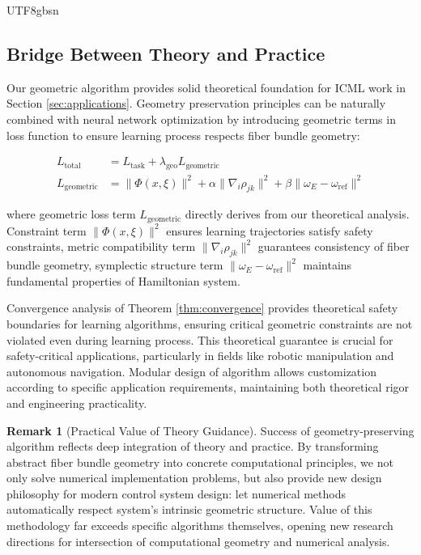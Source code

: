 \documentclass[a4paper,12pt]{extarticle}
\theoremstyle{definition}
\newtheorem{remark}{Remark}
\begin{document}
\begin{CJK}{UTF8}{gbsn}
\subsection{Bridge Between Theory and Practice}
\label{subsec:theory_practice_bridge}

Our geometric algorithm provides solid theoretical foundation for ICML work \cite{zheng2025learning} in Section \ref{sec:applications}. Geometry preservation principles can be naturally combined with neural network optimization by introducing geometric terms in loss function to ensure learning process respects fiber bundle geometry:

\begin{align}
L_{\text{total}} &= L_{\text{task}} + \lambda_{\text{geo}} L_{\text{geometric}} \label{eq:ml_loss}\\
L_{\text{geometric}} &= \|\Phi(x, \xi)\|^2 + \alpha\|\nabla_i\rho_{jk}\|^2 + \beta\|\omega_E - \omega_{\text{ref}}\|^2 \label{eq:geo_loss}
\end{align}

where geometric loss term $L_{\text{geometric}}$ directly derives from our theoretical analysis. Constraint term $\|\Phi(x, \xi)\|^2$ ensures learning trajectories satisfy safety constraints, metric compatibility term $\|\nabla_i\rho_{jk}\|^2$ guarantees consistency of fiber bundle geometry, symplectic structure term $\|\omega_E - \omega_{\text{ref}}\|^2$ maintains fundamental properties of Hamiltonian system.

Convergence analysis of Theorem \ref{thm:convergence} provides theoretical safety boundaries for learning algorithms, ensuring critical geometric constraints are not violated even during learning process. This theoretical guarantee is crucial for safety-critical applications, particularly in fields like robotic manipulation and autonomous navigation. Modular design of algorithm allows customization according to specific application requirements, maintaining both theoretical rigor and engineering practicality.

\begin{remark}[Practical Value of Theory Guidance]
\label{rem:practical_value}
Success of geometry-preserving algorithm reflects deep integration of theory and practice. By transforming abstract fiber bundle geometry into concrete computational principles, we not only solve numerical implementation problems, but also provide new design philosophy for modern control system design: let numerical methods automatically respect system's intrinsic geometric structure. Value of this methodology far exceeds specific algorithms themselves, opening new research directions for intersection of computational geometry and numerical analysis.
\end{remark}


\end{CJK}
\end{document}
